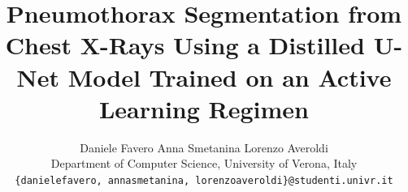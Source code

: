 \documentclass[10pt,twocolumn,letterpaper]{article}
\title{Pneumothorax Segmentation from Chest X-Rays Using a Distilled U-Net Model Trained on an Active Learning Regimen}
\author{
Daniele Favero \quad Anna Smetanina \quad Lorenzo Averoldi\\
Department of Computer Science, University of Verona, Italy\\
{\tt\small \{danielefavero, annasmetanina, lorenzoaveroldi\}@studenti.univr.it}
}
\begin{document}
\maketitle
    





{
    \small
    
    
}

% 
\end{document}
